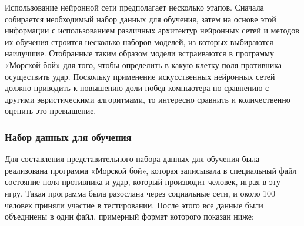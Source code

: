 \documentclass[12pt, a4paper, oneside]{article}
\begin{document}
Использование нейронной сети предполагает несколько этапов. Сначала собирается необходимый набор данных для обучения, затем на основе этой информации с использованием различных архитектур нейронных сетей и методов их обучения строится несколько наборов моделей, из которых выбираются наилучшие. Отобранные таким образом модели встраиваются в программу «Морской бой» для того, чтобы определить в какую клетку поля противника осуществить удар. Поскольку применение искусственных нейронных сетей должно приводить к повышению доли побед компьютера по сравнению с другими эвристическими алгоритмами, то интересно сравнить и количественно оценить это превышение. 

\subsubsection{Набор данных для обучения}

Для составления представительного набора данных для обучения была реализована программа «Морской бой», которая записывала в специальный файл состояние поля противника и удар, который производит человек, играя в эту игру. Такая программа была разослана через социальные сети, и около 100 человек приняли участие в тестировании. После этого все данные были объединены в один файл, примерный формат которого показан ниже:
~\newline
\end{document}
